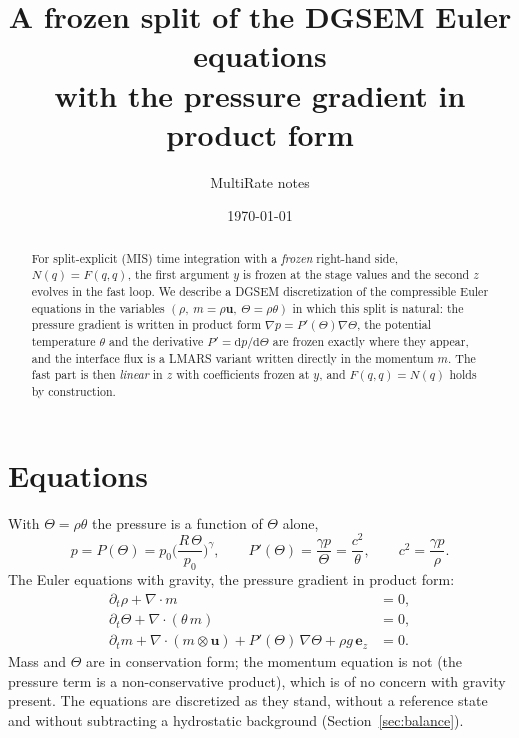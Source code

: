 \documentclass[11pt,a4paper]{article}
\title{A frozen split of the DGSEM Euler equations\\with the pressure gradient in product form}
\author{MultiRate notes}
\date{\today}
\begin{document}
\maketitle

\begin{abstract}
For split-explicit (MIS) time integration with a \emph{frozen} right-hand side, $N(q)=F(q,q)$, the
first argument $y$ is frozen at the stage values and the second $z$ evolves in the fast loop.
We describe a DGSEM discretization of the compressible Euler equations in the variables
$(\rho,\ m=\rho\mathbf u,\ \Theta=\rho\theta)$ in which this split is natural: the pressure gradient
is written in product form $\nabla p = P'(\Theta)\nabla\Theta$, the potential temperature $\theta$ and
the derivative $P'=\mathrm dp/\mathrm d\Theta$ are frozen exactly where they appear, and the interface
flux is a LMARS variant written directly in the momentum $m$. The fast part is then \emph{linear} in
$z$ with coefficients frozen at $y$, and $F(q,q)=N(q)$ holds by construction.
\end{abstract}

\section{Equations}
With $\Theta=\rho\theta$ the pressure is a function of $\Theta$ alone,
\[
p=P(\Theta)=p_0\Big(\frac{R\,\Theta}{p_0}\Big)^{\gamma},\qquad
P'(\Theta)=\frac{\gamma p}{\Theta}=\frac{c^2}{\theta},\qquad c^2=\frac{\gamma p}{\rho}.
\]
The Euler equations with gravity, the pressure gradient in product form:
\begin{align}
\partial_t\rho+\nabla\cdot m&=0,\label{eq:rho}\\
\partial_t\Theta+\nabla\cdot(\theta\,m)&=0,\label{eq:theta}\\
\partial_t m+\nabla\cdot(m\otimes\mathbf u)+P'(\Theta)\,\nabla\Theta+\rho g\,\mathbf e_z&=0.\label{eq:mom}
\end{align}
Mass and $\Theta$ are in conservation form; the momentum equation is not (the pressure term is a
non-conservative product), which is of no concern with gravity present.
The equations are discretized as they stand, without a reference state and without subtracting a
hydrostatic background (Section~\ref{sec:balance}).
\end{document}
